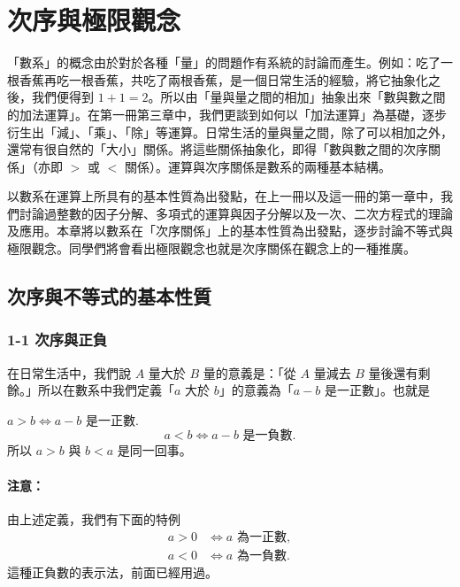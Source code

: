 
\section{次序與極限觀念}\label{sec:b2_ch2}

「數系」的概念由於對於各種「量」的問題作有系統的討論而產生。例如：吃了一根香蕉再吃一根香蕉，共吃了兩根香蕉，是一個日常生活的經驗，將它抽象化之後，我們便得到 $1+1=2$。所以由「量與量之間的相加」抽象出來「數與數之間的加法運算」。在第一冊第三章中，我們更談到如何以「加法運算」為基礎，逐步衍生出「減」、「乘」、「除」等運算。日常生活的量與量之間，除了可以相加之外，還常有很自然的「大小」關係。將這些關係抽象化，即得「數與數之間的次序關係」（亦即 $>$ 或 $<$ 關係）。運算與次序關係是數系的兩種基本結構。

以數系在運算上所具有的基本性質為出發點，在上一冊以及這一冊的第一章中，我們討論過整數的因子分解、多項式的運算與因子分解以及一次、二次方程式的理論及應用。本章將以數系在「次序關係」上的基本性質為出發點，逐步討論不等式與極限觀念。同學們將會看出極限觀念也就是次序關係在觀念上的一種推廣。

\subsection{次序與不等式的基本性質}\label{sec:b2_2-1}

\subsubsection*{1-1 次序與正負}

在日常生活中，我們說 $A$ 量大於 $B$ 量的意義是：「從 $A$ 量減去 $B$ 量後還有剩餘。」所以在數系中我們定義「$a$ 大於 $b$」的意義為「$a-b$ 是一正數」。也就是
\begin{definition*}
$a>b \iff a-b \text{ 是一正數}.$
\[
a<b \iff a-b \text{ 是一負數}.
\]
所以 $a>b$ 與 $b<a$ 是同一回事。
\end{definition*}

\paragraph{注意：} 由上述定義，我們有下面的特例
\begin{align*}
a>0 &\iff a \text{ 為一正數}, \\
a<0 &\iff a \text{ 為一負數}.
\end{align*}
這種正負數的表示法，前面已經用過。

